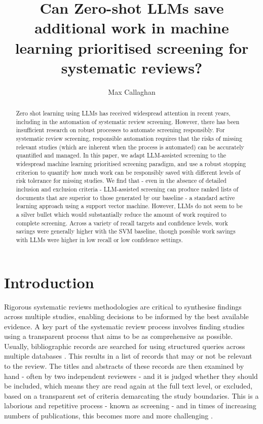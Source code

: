 \documentclass{article}
\title{Can Zero-shot LLMs save additional work in machine learning prioritised screening for systematic reviews?}
\author[1,2]{Max Callaghan}
\affil[1]{Mercator Research Institute on Global Commons and Climate Change, Torgauer Straße 12-15, 10829 Berlin, Germany}
\affil[2]{%
	Potsdam Institute for Climate Impact Research (PIK), Member of the Leibniz Association, P.O. Box 60 12 03, 14412 Potsdam, Germany
}
\begin{document}
	\maketitle
	
	\doublespacing
	
	\begin{abstract}
		Zero shot learning using LLMs has received widespread attention in recent years, including in the automation of systematic review screening. 
		However, there has been insufficient research on robust processes to automate screening responsibly. 
		For systematic review screening, responsible automation requires that the risks of missing relevant studies (which are inherent when the process is automated) can be accurately quantified and managed. 
		In this paper, we adapt LLM-assisted screening to the widespread machine learning prioritised screening paradigm, and use a robust stopping criterion to quantify how much work can be responsibly saved with different levels of risk tolerance for missing studies.
		We find that - even in the absence of detailed inclusion and exclusion criteria - LLM-assisted screening can produce ranked lists of documents that are superior to those generated by our baseline - a standard active learning approach using a support vector machine.
		However, LLMs do not seem to be a silver bullet which would substantially reduce the amount of work required to complete screening. Across a variety of recall targets and confidence levels, work savings were generally higher with the SVM baseline, though possible work savings with LLMs were higher in low recall or low confidence settings. 
	\end{abstract}

	\section*{Introduction}
	
	Rigorous systematic reviews methodologies are critical to synthesise findings across multiple studies, enabling decisions to be informed by the best available evidence. 
	A key part of the systematic review process involves finding studies using a transparent process that aims to be as comprehensive as possible. 
	Usually, bibliographic records are searched for using structured queries across multiple databases \cite{lefebvre_chapter_2023}.
	This results in a list of records that may or not be relevant to the review. The titles and abstracts of these records are then examined by hand - often by two independent reviewers - and it is judged whether they should be included, which means they are read again at the full text level, or excluded, based on a transparent set of criteria demarcating the study boundaries.
	This is a laborious and repetitive process - known as screening - and in times of increasing numbers of publications, this becomes more and more challenging \cite{bornmann_growth_2015}. 
	
\end{document}
